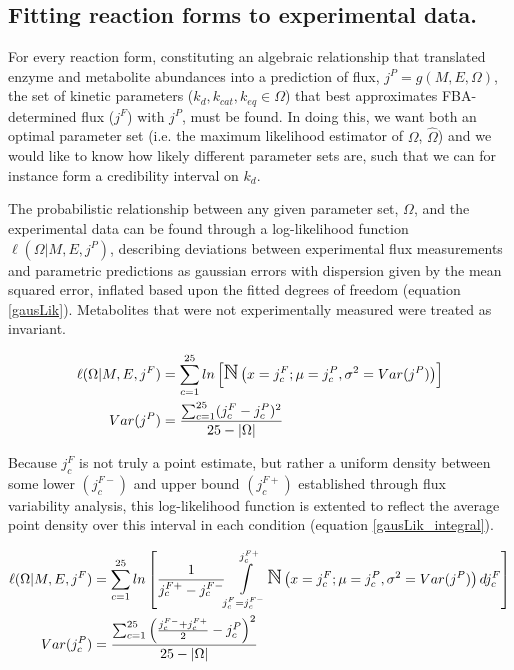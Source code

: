 \documentclass[12pt]{nature}\usepackage{graphicx, color}
\begin{document}
\subsection{Fitting reaction forms to experimental data.}

For every reaction form, constituting an algebraic relationship that translated enzyme and metabolite abundances into a prediction of flux, $j^{P} = g(M, E, \Omega)$, the set of kinetic parameters ($k_{d}, k_{cat}, k_{eq} \in \Omega$) that best approximates FBA-determined flux ($j^{F}$) with $j^{P}$, must be found.  In doing this, we want both an optimal parameter set (i.e. the maximum likelihood estimator of $\Omega$, $\hat{\Omega}$) and we would like to know how likely different parameter sets are, such that we can for instance form a credibility interval on $k_{d}$.

The probabilistic relationship between any given parameter set, $\Omega$, and the experimental data can be found through a log-likelihood function $\ell(\Omega | M, E, j^{P})$, describing deviations between experimental flux measurements and parametric predictions as gaussian errors with dispersion given by the mean squared error, inflated based upon the fitted degrees of freedom (equation \ref{gausLik}). Metabolites that were not experimentally measured were treated as invariant.

\begin{align}
\ell(\Omega | M, E, j^{F}) &= \sum_{c = 1}^{25}ln\left[\mbox{\Large $\mathbb{N}$}\left(x = j^{F}_{c}; \mu = j^{P}_{c}, \sigma^{2} =  Var(j^{P})\right)\right]\notag\\
Var(j^{P}) &= \frac{\sum_{c = 1}^{25} (j^{F}_{c} - j^{P}_{c})^2}{25 - \left\vert{\Omega}\right\vert}\label{gausLik}
\end{align}

Because $j_{c}^{F}$ is not truly a point estimate, but rather a uniform density between some lower $(j_{c}^{F-})$ and upper bound $(j_{c}^{F+})$ established through flux variability analysis, this log-likelihood function is extented to reflect the average point density over this interval in each condition (equation \ref{gausLik_integral}).

\begin{align}
\ell(\Omega | M, E, j^{F}) &= \sum_{c = 1}^{25}ln\left[\frac{1}{j_{c}^{F+} - j_{c}^{F-}}\mathlarger{\int}\limits_{j_{c}^{F} = j_{c}^{F-}}^{j_{c}^{F+}} \mbox{\Large $\mathbb{N}$}\left(x = j^{F}_{c}; \mu = j^{P}_{c}, \sigma^{2} =  Var(j^{P})\right)dj^{F}_{c}\right]\notag\\
Var(j^{P}_{c}) &= \frac{\sum_{c = 1}^{25} \left(\frac{j^{F-}_{c} + j^{F+}_{c}}{2} - j^{P}_{c}\right)^2}{25 - \left\vert{\Omega}\right\vert}\label{gausLik_integral}
\end{align}
\end{document}
